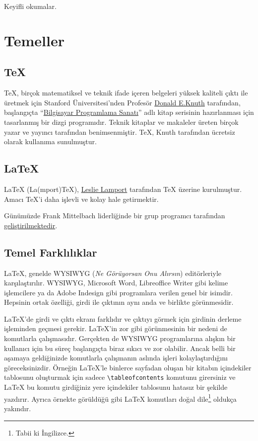\documentclass[
  letterpaper,
  DIV=11,
  numbers=noendperiod]{scrreprt}
\begin{document}
Keyifli okumalar.


\hypertarget{temeller}{%
\chapter{Temeller}\label{temeller}}

\hypertarget{tex}{%
\section{\texorpdfstring{{\TeX}}{}}\label{tex}}

{\TeX}, birçok matematiksel ve teknik ifade içeren belgeleri yüksek
kaliteli çıktı ile üretmek için Stanford Üniversitesi'nden Profesör
\href{https://www-cs-faculty.stanford.edu/~knuth/}{Donald E.Knuth}
tarafından, başlangıçta
``\href{https://www-cs-faculty.stanford.edu/~knuth/taocp.html}{Bilgisayar
Programlama Sanatı}'' adlı kitap serisinin hazırlanması için tasarlanmış
bir dizgi programıdır. Teknik kitaplar ve makaleler üreten birçok yazar
ve yayıncı tarafından benimsenmiştir. {\TeX}, Knuth tarafından ücretsiz
olarak kullanıma sunulmuştur.

\hypertarget{latex}{%
\section{\texorpdfstring{{\LaTeX}}{}}\label{latex}}

{\LaTeX} (La(mport){\TeX}), \href{http://www.lamport.org/}{Leslie
Lamport} tarafından {\TeX} üzerine kurulmuştur. Amacı {\TeX}'i daha
işlevli ve kolay hale getirmektir.

Günümüzde Frank Mittelbach liderliğinde bir grup programcı tarafından
\href{https://www.latex-project.org/latex3/}{geliştirilmektedir}.

\hypertarget{temel-farklux131lux131klar}{%
\section{Temel Farklılıklar}\label{temel-farklux131lux131klar}}

{\LaTeX}, genelde WYSIWYG (\emph{Ne Görüyorsan Onu Alırsın})
editörleriyle karşılaştırılır. WYSIWYG, Microsoft Word, Libreoffice
Writer gibi kelime işlemcilere ya da Adobe Indesign gibi programlara
verilen genel bir isimdir. Hepsinin ortak özelliği, girdi ile çıktının
aynı anda ve birlikte görünmesidir.

{\LaTeX}'de girdi ve çıktı ekranı farklıdır ve çıktıyı görmek için
girdinin derleme işleminden geçmesi gerekir. {\LaTeX}'in zor gibi
görünmesinin bir nedeni de komutlarla çalışmasıdır. Gerçekten de WYSIWYG
programlarına alışkın bir kullanıcı için bu süreç başlangıçta biraz
sıkıcı ve zor olabilir. Ancak belli bir aşamaya geldiğinizde komutlarla
çalışmanın aslında işleri kolaylaştırdığını göreceksinizdir. Örneğin
{\LaTeX}'le binlerce sayfadan oluşan bir kitabın içindekiler tablosunu
oluşturmak için sadece \texttt{\textbackslash{}tableofcontents} komutunu
girersiniz ve {\LaTeX} bu komutu girdiğiniz yere içindekiler tablosunu
hatasız bir şekilde yazdırır. Ayrıca örnekte görüldüğü gibi {\LaTeX}
komutları doğal dile\footnote{Tabii ki İngilizce.} oldukça yakındır.
\end{document}
